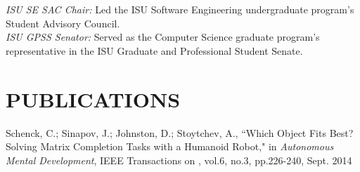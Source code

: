 \documentclass[margin, 10pt]{res} %
\begin{document}
\begin{resume}
{\sl ISU SE SAC Chair:} Led the ISU Software Engineering undergraduate program's
  Student Advisory Council.\\
{\sl ISU GPSS Senator:} Served as the Computer Science graduate program's
  representative in the ISU Graduate and Professional Student Senate.


\section{PUBLICATIONS}

Schenck, C.; Sinapov, J.; Johnston, D.; Stoytchev, A., ``Which Object Fits Best?
Solving Matrix Completion Tasks with a Humanoid Robot," in {\sl Autonomous
Mental Development}, IEEE Transactions on , vol.6, no.3, pp.226-240, Sept. 2014

\end{resume}
\end{document}
